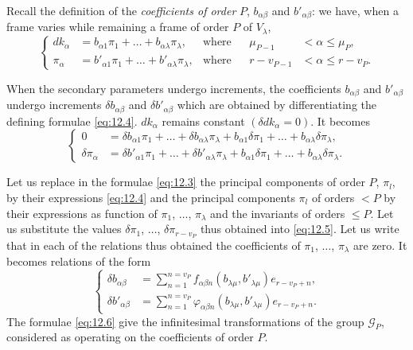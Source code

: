 \documentclass[leqno,11pt]{book}
\makeatletter
\numberwithin{equation}{chapter}
\theoremstyle{shape1}
\theoremstyle{shapesmall}
\let\old@phi\phi
\let\old@varphi\varphi
\let\phi\old@varphi
\let\varphi\old@phi
\makeatother
\begin{document}
Recall the definition of the \emph{coefficients of order} $P$, $b_{\alpha\beta}$ and $b'_{\alpha\beta}$: we have, when a frame varies while remaining a frame of order $P$ of $V_{\lambda}$,
\begin{equation}
  \label{eq:12.4}
  \left\{
    \begin{aligned}
      dk_{\alpha}&=b_{\alpha 1}\pi_{1}+\dots+b_{\alpha\lambda}\pi_{\lambda},&\text{where}&&\mu_{P-1}&<\alpha\le\mu_{P},\\
      \pi_{\alpha}&=b'_{\alpha 1}\pi_{1}+\dots+b'_{\alpha\lambda}\pi_{\lambda},&\text{where}&&r-v_{P-1}&<\alpha\le r-v_{P}.
    \end{aligned}
  \right.
\end{equation}

When the secondary parameters undergo increments, the coefficients $b_{\alpha\beta}$ and $b'_{\alpha\beta}$ undergo increments $\delta b_{\alpha\beta}$ and $\delta b'_{\alpha\beta}$ which are obtained by differentiating the defining formulae \eqref{eq:12.4}. $dk_{\alpha}$ remains constant $(\delta dk_{\alpha}=0)$. It becomes
\begin{equation}
  \label{eq:12.5}
  \left\{
    \begin{aligned}
      0&=\delta b_{\alpha 1}\pi_{1}+\dots+\delta b_{\alpha\lambda}\pi_{\lambda}+b_{\alpha 1}\delta \pi_{1}+\dots+ b_{\alpha\lambda}\delta \pi_{\lambda},\\
      \delta\pi_{\alpha}&=\delta b'_{\alpha 1}\pi_{1}+\dots+\delta b'_{\alpha\lambda}\pi_{\lambda}+b_{\alpha 1}\delta \pi_{1}+\dots+ b_{\alpha\lambda}\delta \pi_{\lambda}.
    \end{aligned}
  \right.
\end{equation}

Let us replace in the formulae \eqref{eq:12.3} the principal components of order $P$, $\pi_{l}$, by their expressions \eqref{eq:12.4} and the principal components $\pi_{l}$ of orders $<P$ by their expressions as function of $\pi_{1}$, $\dots$, $\pi_{\lambda}$ and the invariants of orders $\le P$. Let us substitute the values $\delta\pi_{1}$, $\dots$, $\delta\pi_{r-v_{P}}$ thus obtained into \eqref{eq:12.5}. Let us write that in each of the relations thus obtained the coefficients of $\pi_{1}$, $\dots$, $\pi_{\lambda}$ are zero. It becomes relations of the form
\begin{equation}
  \label{eq:12.6}
  \left\{
    \begin{aligned}
      \delta b_{\alpha\beta}&=\sum_{n=1}^{n=v_{P}}f_{\alpha\beta n}(b_{\lambda\mu},b'_{\lambda\mu})e_{r-v_{P}+n},\\
      \delta b'_{\alpha\beta}&=\sum_{n=1}^{n=v_{P}}\phi_{\alpha\beta n}(b_{\lambda\mu},b'_{\lambda\mu})e_{r-v_{P}+n}.
    \end{aligned}
  \right.
\end{equation}
The formulae \eqref{eq:12.6} give the infinitesimal transformations of the group $\mathcal{G}_{P}$, considered as operating on the coefficients of order $P$.
\end{document}
